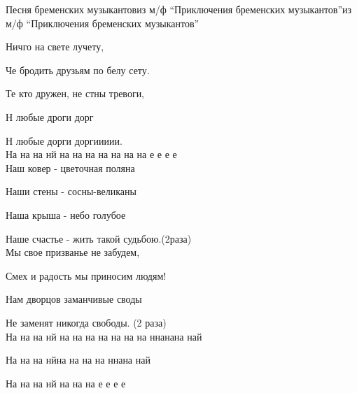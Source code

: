 \documentclass[11pt,a5paper]{book}
\begin{document}
\begin{song}{Песня бременских музыкантов}{}{из м/ф “Приключения бременских музыкантов”}{из м/ф “Приключения бременских музыкантов”}{}{}

Ничго на свете лучету,\par
Че бродить друзьям по белу сету.\par
Те кто дружен, не стны тревоги,\par
Н любые дроги дорг\par
Н любые дорги доргиииии.\\

На на на нй на на на на на на на  е е е е\\
 
Наш ковер - цветочная поляна\par
Наши стены - сосны-великаны\par
Наша крыша - небо голубое\par
Наше счастье - жить такой судьбою.(2раза)\\
 
Мы свое призванье не забудем,\par
Смех и радость мы приносим людям!\par
Нам дворцов заманчивые своды\par
Не заменят никогда свободы. (2 раза)\\

На на на нй на на на на на на на ннанана най\par
На на на нйна на на на ннана най\par
На на на нй на на на  е е е е\\
 
\end{song}
\end{document}
